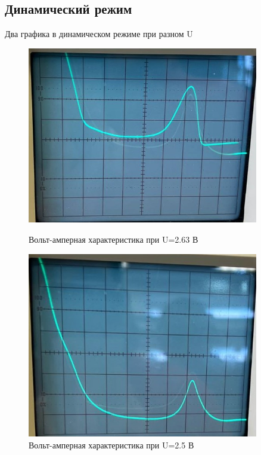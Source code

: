 \documentclass[a4paper,12pt]{article}
\begin{document}
\subsection*{Динамический режим}
Два графика в динамическом режиме при разном U
\begin{figure}[H]
\begin{minipage}[c]{0.5\textwidth}
\includegraphics[width = 0.9\textwidth]{graph1.jpg}
\caption{Вольт-амперная характеристика при U=2.63 В}
\end{minipage}
\begin{minipage}[c]{0.5\textwidth}
\includegraphics[width = 0.9\textwidth]{graph2.jpg}
\caption{Вольт-амперная характеристика при U=2.5 В}
\end{minipage}
\end{figure}
\end{document}
